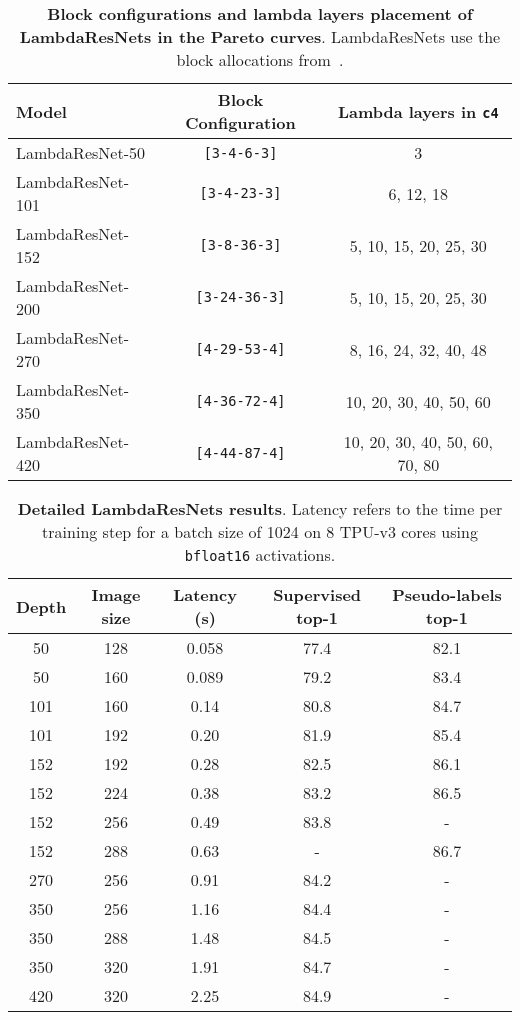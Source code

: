 \documentclass{article} \usepackage{iclr2021_conference,times}
\begin{document}
\begin{table}[h]
    \begin{center}
    \small
    \begin{tabular}{l|cc}
    \toprule
    Model & Block Configuration & Lambda layers in \texttt{c4} \\
    \midrule
    LambdaResNet-50 & \texttt{[3-4-6-3]} & 3 \\
    LambdaResNet-101 & \texttt{[3-4-23-3]} & 6, 12, 18 \\
    LambdaResNet-152 & \texttt{[3-8-36-3]} & 5, 10, 15, 20, 25, 30 \\ 
    LambdaResNet-200 & \texttt{[3-24-36-3]} & 5, 10, 15, 20, 25, 30 \\ 
    LambdaResNet-270 & \texttt{[4-29-53-4]} & 8, 16, 24, 32, 40, 48 \\
    LambdaResNet-350 & \texttt{[4-36-72-4]} & 10, 20, 30, 40, 50, 60 \\
    LambdaResNet-420 & \texttt{[4-44-87-4]} & 10, 20, 30, 40, 50, 60, 70, 80 \\
    \bottomrule
    \end{tabular}
    \end{center}
    \caption{\textbf{Block configurations and lambda layers placement of LambdaResNets in the Pareto curves}.
    LambdaResNets use the block allocations from~\cite{he2015deep,bello2021revisiting}.}
    \label{tab:block_config_details} 
\end{table}

\begin{table}[h!]
\begin{center}
    \begin{tabular}{ccc|cc}
    \toprule
    Depth & Image size & Latency (s) & Supervised top-1 & Pseudo-labels top-1 \\
    \midrule
    50 & 128 & 0.058 & 77.4 & 82.1 \\
    50 & 160 & 0.089 & 79.2 & 83.4 \\
    101 & 160 & 0.14 & 80.8 & 84.7 \\
    101 & 192 & 0.20 & 81.9 & 85.4 \\
    152 & 192 & 0.28 & 82.5 & 86.1 \\
    152 & 224 & 0.38 & 83.2 & 86.5 \\
    152 & 256 & 0.49 & 83.8 & - \\
    152 & 288 & 0.63 & - & 86.7 \\
    270 & 256 & 0.91 & 84.2 & - \\
    350 & 256 & 1.16 & 84.4 & - \\
    350 & 288 & 1.48 & 84.5 & - \\
    350 & 320 & 1.91 & 84.7 & - \\
    420 & 320 & 2.25 & 84.9 & - \\
    \bottomrule
    \end{tabular}
\end{center}
\caption{
\textbf{Detailed LambdaResNets results}.
Latency refers to the time per training step for a batch size of 1024 on 8 TPU-v3 cores using \texttt{bfloat16} activations.
}
\label{tab:pareto_curve_details} 
\end{table}
\end{document}
